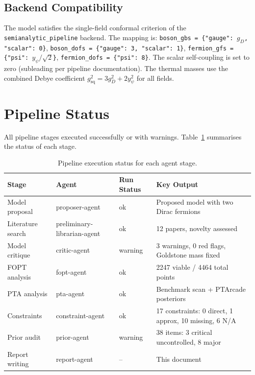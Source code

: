 \documentclass[12pt,a4paper]{article}
\begin{document}
\subsection{Backend Compatibility}

The model satisfies the single-field conformal criterion of the \texttt{semianalytic\_pipeline} backend. The mapping is: \texttt{boson\_gbs = \{"gauge": $g_D$, "scalar": 0\}}, \texttt{boson\_dofs = \{"gauge": 3, "scalar": 1\}}, \texttt{fermion\_gfs = \{"psi": $y_\psi/\sqrt{2}$\}}, \texttt{fermion\_dofs = \{"psi": 8\}}. The scalar self-coupling is set to zero (subleading per pipeline documentation). The thermal masses use the combined Debye coefficient $g^2_\text{sq} = 3g_D^2 + 2y_\psi^2$ for all fields.

\section{Pipeline Status}
\label{sec:pipeline}

All pipeline stages executed successfully or with warnings. Table~\ref{tab:pipeline} summarises the status of each stage.

\begin{table}[H]
\centering
\caption{Pipeline execution status for each agent stage.}
\label{tab:pipeline}
\begin{tabular}{llll}
\toprule
Stage & Agent & Run Status & Key Output \\
\midrule
Model proposal & proposer-agent & ok & Proposed model with two Dirac fermions \\
Literature search & preliminary-librarian-agent & ok & 12 papers, novelty assessed \\
Model critique & critic-agent & warning & 3 warnings, 0 red flags, Goldstone mass fixed \\
FOPT analysis & fopt-agent & ok & 2247 viable / 4464 total points \\
PTA analysis & pta-agent & ok & Benchmark scan + PTArcade posteriors \\
Constraints & constraint-agent & ok & 17 constraints: 0 direct, 1 approx, 10 missing, 6 N/A \\
Prior audit & prior-agent & warning & 38 items: 3 critical uncontrolled, 8 major \\
Report writing & report-agent & -- & This document \\
\bottomrule
\end{tabular}
\end{table}
\end{document}
